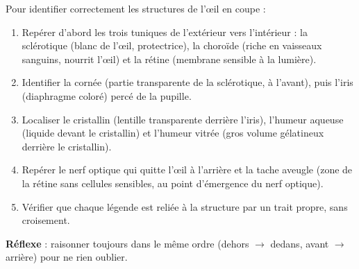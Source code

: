 \documentclass[11pt]{article}
\newcommand{\cle}[1]{{\popxbold\color{popdark}#1}}
\begin{document}
\begin{methode}
Pour identifier correctement les structures de l'œil en coupe :
\begin{enumerate}
\item Repérer d'abord les \cle{trois tuniques} de l'extérieur vers l'intérieur : la \cle{sclérotique} (blanc de l'œil, protectrice), la \cle{choroïde} (riche en vaisseaux sanguins, nourrit l'œil) et la \cle{rétine} (membrane sensible à la lumière).
\item Identifier la \cle{cornée} (partie transparente de la sclérotique, à l'avant), puis l'\cle{iris} (diaphragme coloré) percé de la \cle{pupille}.
\item Localiser le \cle{cristallin} (lentille transparente derrière l'iris), l'\cle{humeur aqueuse} (liquide devant le cristallin) et l'\cle{humeur vitrée} (gros volume gélatineux derrière le cristallin).
\item Repérer le \cle{nerf optique} qui quitte l'œil à l'arrière et la \cle{tache aveugle} (zone de la rétine sans cellules sensibles, au point d'émergence du nerf optique).
\item Vérifier que chaque légende est reliée à la structure par un trait propre, sans croisement.
\end{enumerate}
\textbf{Réflexe} : raisonner toujours dans le même ordre (dehors $\rightarrow$ dedans, avant $\rightarrow$ arrière) pour ne rien oublier.
\end{methode}
\end{document}
